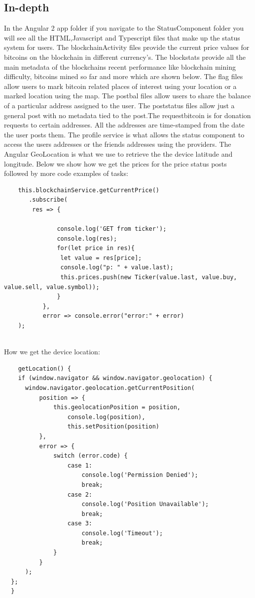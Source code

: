 \subsection{In-depth}
In the Angular 2 app folder if you navigate to the StatusComponent folder you will see all the HTML,Javascript and Typescript files that make up the status system for users. The blockchainActivity files provide the current price values for bitcoins on the blockchain in different currency's. The blockstats provide all the main metadata of the blockchains recent performance like blockchain mining difficulty, bitcoins mined so far and more which are shown below. The flag files allow users to mark bitcoin related places of interest using your location or a marked location using the map. The postbal files allow users to share the balance of a particular address assigned to the user. The poststatus files allow just a general post with no metadata tied to the post.The requestbitcoin is for donation requests to certain addresses. All the addresses are time-stamped from the date the user posts them. The profile service is what allows the status component to access the users addresses or the friends addresses using the providers. The Angular GeoLocation is what we use to retrieve the the device latitude and longitude. Below we show how we get the prices for the price status posts followed by more code examples of tasks:


\begin{lstlisting}
    this.blockchainService.getCurrentPrice()
       .subscribe(
        res => {

               console.log('GET from ticker');
               console.log(res);
               for(let price in res){
                let value = res[price];
                console.log("p: " + value.last); 
                this.prices.push(new Ticker(value.last, value.buy, value.sell, value.symbol));
               } 
           },
           error => console.error("error:" + error)
    );
  
\end{lstlisting}

How we get the device location:
\begin{lstlisting}
    getLocation() {
    if (window.navigator && window.navigator.geolocation) {
      window.navigator.geolocation.getCurrentPosition(
          position => {
              this.geolocationPosition = position,
                  console.log(position),
                  this.setPosition(position)
          },
          error => {
              switch (error.code) {
                  case 1:
                      console.log('Permission Denied');
                      break;
                  case 2:
                      console.log('Position Unavailable');
                      break;
                  case 3:
                      console.log('Timeout');
                      break;
              }
          }
      );
  };
  }
  
\end{lstlisting}

